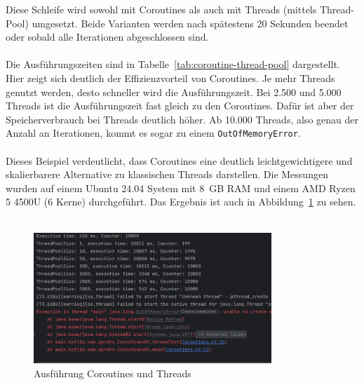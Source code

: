 \documentclass[11pt]{article}
\begin{document}
    Diese Schleife wird sowohl mit Coroutines als auch mit Threads (mittels Thread-Pool) umgesetzt.
    Beide Varianten werden nach spätestens 20 Sekunden beendet oder sobald alle Iterationen abgeschlossen sind.\\
    \\
    Die Ausführungszeiten sind in Tabelle~\ref{tab:coroutine-thread-pool} dargestellt.
    Hier zeigt sich deutlich der Effizienzvorteil von Coroutines.
    Je mehr Threads genutzt werden, desto schneller wird die Ausführungszeit.
    Bei 2.500 und 5.000 Threads ist die Ausführungszeit fast gleich zu den Coroutines.
    Dafür ist aber der Speicherverbrauch bei Threads deutlich höher.
    Ab 10.000 Threads, also genau der Anzahl an Iterationen, kommt es sogar zu einem \texttt{OutOfMemoryError}.\\
    \\
    Dieses Beispiel verdeutlicht, dass Coroutines eine deutlich leichtgewichtigere und skalierbarere Alternative zu klassischen Threads darstellen.
    Die Messungen wurden auf einem Ubuntu 24.04 System mit 8~GB RAM und einem AMD Ryzen 5 4500U (6 Kerne) durchgeführt.
    Das Ergebnis ist auch in Abbildung~\ref{fig:coroutines-threads} zu sehen.\\
    \\
    \begin{figure}[h]
        \centering
        \includegraphics[width=0.8\textwidth]{pictures/Bildschirmfoto vom 2025-04-08 20-09-18}
        \caption{Ausführung Coroutines und Threads}
        \label{fig:coroutines-threads}
    \end{figure}
    \\
\end{document}
